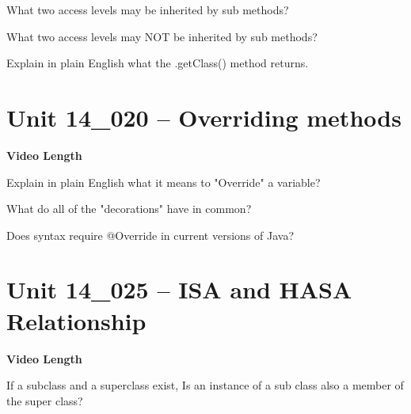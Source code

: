 \documentclass[letterpaper,12pt]{exam}
\newcommand{\unit}{Unit 14}
\begin{document}
\begin{questions}
\begin{samepage}
    \question What two access levels may be inherited by sub methods?
    \vspace{5mm}
\end{samepage}
\begin{samepage}
    \question What two access levels may NOT be inherited by sub methods?
    \vspace{5mm}
\end{samepage}

\begin{samepage}
    \question Explain in plain English what the .getClass() method returns.
    \vspace{5mm}
\end{samepage}


\section*{\unit\_020 -- Overriding methods } 
\par{\selectfont\textbf{Video Length }}

\begin{samepage}
    \question Explain in plain English what it means to "Override" a variable?
    \vspace{5mm}
\end{samepage}

\begin{samepage}
    \question What do all of the "decorations" have in common?
    \vspace{5mm}
\end{samepage}

\begin{samepage}
    \question Does syntax require @Override in current versions of Java?
    \vspace{5mm}
\end{samepage}




\section*{\unit\_025 -- ISA and HASA Relationship } 
\par{\selectfont\textbf{Video Length }}

\begin{samepage}
    \question If a subclass and a superclass exist, Is an instance of a sub class also a member of the super class?
    \vspace{5mm}
\end{samepage}


\end{questions}
\end{document}
